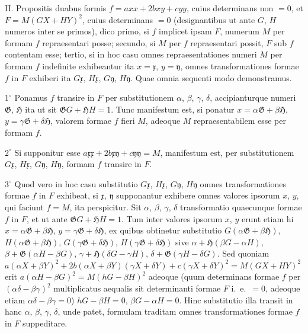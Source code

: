 \documentclass[12pt,a4paper]{article}
\theoremstyle{plain}
\theoremstyle{definition}
\theoremstyle{remark}
\begin{document}
II. Propositis duabus formis $f=axx+2bxy+cyy$, cuius determinans non $=0$, et $F=M(GX+HY)^2$, cuius determinans $=0$ (designantibus ut ante $G$, $H$ numeros inter se primos), dico primo, si $f$ implicet ipsam $F$, numerum $M$ per formam $f$ repraesentari posse; secundo, si $M$ per $f$ repraesentari possit, $F$ sub $f$ contentam esse; tertio, si in hoc casu omnes repraesentationes numeri $M$ per formam $f$ indefinite exhibeantur ita $x=\mathfrak{x}$, $y=\mathfrak{y}$, omnes transformationes formae $f$ in $F$ exhiberi ita $G\mathfrak{x}$, $H\mathfrak{x}$, $G\mathfrak{y}$, $H\mathfrak{y}$. Quae omnia sequenti modo demonstramus.

$1^\circ$ Ponamus $f$ transire in $F$ per substitutionem $\alpha$, $\beta$, $\gamma$, $\delta$, accipianturque numeri $\mathfrak{G}$, $\mathfrak{H}$ ita ut sit $\mathfrak{G}G+\mathfrak{H}H=1$. Tunc manifestum est, si ponatur $x=\alpha\mathfrak{G}+\beta\mathfrak{H}$, $y=\gamma\mathfrak{G}+\delta\mathfrak{H}$, valorem formae $f$ fieri $M$, adeoque $M$ repraesentabilem esse per formam $f$.

$2^\circ$ Si supponitur esse $a\mathfrak{x}\mathfrak{x}+2b\mathfrak{x}\mathfrak{y}+c\mathfrak{y}\mathfrak{y}=M$, manifestum est, per substitutionem $G\mathfrak{x}$, $H\mathfrak{x}$, $G\mathfrak{y}$, $H\mathfrak{y}$, formam $f$ transire in $F$.

$3^\circ$ Quod vero in hoc casu substitutio $G\mathfrak{x}$, $H\mathfrak{x}$, $G\mathfrak{y}$, $H\mathfrak{y}$ omnes transformationes formae $f$ in $F$ exhibeat, si $\mathfrak{x}$, $\mathfrak{y}$ supponantur exhibere omnes valores ipsorum $x$, $y$, qui faciunt $f=M$, ita perspicitur. Sit $\alpha$, $\beta$, $\gamma$, $\delta$ transformatio quaecunque formae $f$ in $F$, et ut ante $\mathfrak{G}G+\mathfrak{H}H=1$. Tum inter valores ipsorum $x$, $y$ erunt etiam hi $x=\alpha\mathfrak{G}+\beta\mathfrak{H}$, $y=\gamma\mathfrak{G}+\delta\mathfrak{H}$, ex quibus obtinetur substitutio $G(\alpha\mathfrak{G}+\beta\mathfrak{H})$, $H(\alpha\mathfrak{G}+\beta\mathfrak{H})$, $G(\gamma\mathfrak{G}+\delta\mathfrak{H})$, $H(\gamma\mathfrak{G}+\delta\mathfrak{H})$ sive $\alpha+\mathfrak{H}(\beta G-\alpha H)$, $\beta+\mathfrak{G}(\alpha H-\beta G)$, $\gamma+\mathfrak{H}(\delta G-\gamma H)$, $\delta+\mathfrak{G}(\gamma H-\delta G)$. Sed quoniam $a(\alpha X+\beta Y)^2+2b(\alpha X+\beta Y)(\gamma X+\delta Y)+c(\gamma X+\delta Y)^2 = M(GX+HY)^2$ erit $a(\alpha H-\beta G)^2=M(hG-\beta H)^2$ adeoque (quum determinans formae $f$ per $(\alpha\delta-\beta\gamma)^2$ multiplicatus aequalis sit determinanti formae $F$ i.\ e.\ $=0$, adeoque etiam $\alpha\delta-\beta\gamma=0$) $hG-\beta H=0$, $\beta G-\alpha H=0$. Hinc substitutio illa transit in hanc $\alpha$, $\beta$, $\gamma$, $\delta$, unde patet, formulam traditam omnes transformationes formae $f$ in $F$ suppeditare.
\end{document}
